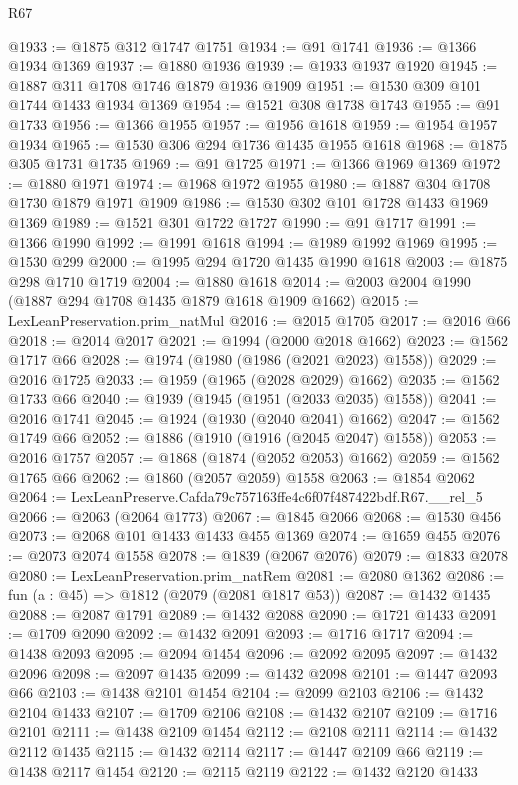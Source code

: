 \begin{lexlean}{R67}
\begin{coremodule}
@1933 := @1875 @312 @1747 @1751
@1934 := @91 @1741
@1936 := @1366 @1934 @1369
@1937 := @1880 @1936
@1939 := @1933 @1937 @1920
@1945 := @1887 @311 @1708 @1746 @1879 @1936 @1909
@1951 := @1530 @309 @101 @1744 @1433 @1934 @1369
@1954 := @1521 @308 @1738 @1743
@1955 := @91 @1733
@1956 := @1366 @1955
@1957 := @1956 @1618
@1959 := @1954 @1957 @1934
@1965 := @1530 @306 @294 @1736 @1435 @1955 @1618
@1968 := @1875 @305 @1731 @1735
@1969 := @91 @1725
@1971 := @1366 @1969 @1369
@1972 := @1880 @1971
@1974 := @1968 @1972 @1955
@1980 := @1887 @304 @1708 @1730 @1879 @1971 @1909
@1986 := @1530 @302 @101 @1728 @1433 @1969 @1369
@1989 := @1521 @301 @1722 @1727
@1990 := @91 @1717
@1991 := @1366 @1990
@1992 := @1991 @1618
@1994 := @1989 @1992 @1969
@1995 := @1530 @299
@2000 := @1995 @294 @1720 @1435 @1990 @1618
@2003 := @1875 @298 @1710 @1719
@2004 := @1880 @1618
@2014 := @2003 @2004 @1990 (@1887 @294 @1708 @1435 @1879 @1618 @1909 @1662)
@2015 := LexLeanPreservation.prim_natMul
@2016 := @2015 @1705
@2017 := @2016 @66
@2018 := @2014 @2017
@2021 := @1994 (@2000 @2018 @1662)
@2023 := @1562 @1717 @66
@2028 := @1974 (@1980 (@1986 (@2021 @2023) @1558))
@2029 := @2016 @1725
@2033 := @1959 (@1965 (@2028 @2029) @1662)
@2035 := @1562 @1733 @66
@2040 := @1939 (@1945 (@1951 (@2033 @2035) @1558))
@2041 := @2016 @1741
@2045 := @1924 (@1930 (@2040 @2041) @1662)
@2047 := @1562 @1749 @66
@2052 := @1886 (@1910 (@1916 (@2045 @2047) @1558))
@2053 := @2016 @1757
@2057 := @1868 (@1874 (@2052 @2053) @1662)
@2059 := @1562 @1765 @66
@2062 := @1860 (@2057 @2059) @1558
@2063 := @1854 @2062
@2064 := LexLeanPreserve.Cafda79c757163ffe4c6f07f487422bdf.R67.__rel_5
@2066 := @2063 (@2064 @1773)
@2067 := @1845 @2066
@2068 := @1530 @456
@2073 := @2068 @101 @1433 @1433 @455 @1369
@2074 := @1659 @455
@2076 := @2073 @2074 @1558
@2078 := @1839 (@2067 @2076)
@2079 := @1833 @2078
@2080 := LexLeanPreservation.prim_natRem
@2081 := @2080 @1362
@2086 := fun (a : @45) => @1812 (@2079 (@2081 @1817 @53))
@2087 := @1432 @1435
@2088 := @2087 @1791
@2089 := @1432 @2088
@2090 := @1721 @1433
@2091 := @1709 @2090
@2092 := @1432 @2091
@2093 := @1716 @1717
@2094 := @1438 @2093
@2095 := @2094 @1454
@2096 := @2092 @2095
@2097 := @1432 @2096
@2098 := @2097 @1435
@2099 := @1432 @2098
@2101 := @1447 @2093 @66
@2103 := @1438 @2101 @1454
@2104 := @2099 @2103
@2106 := @1432 @2104 @1433
@2107 := @1709 @2106
@2108 := @1432 @2107
@2109 := @1716 @2101
@2111 := @1438 @2109 @1454
@2112 := @2108 @2111
@2114 := @1432 @2112 @1435
@2115 := @1432 @2114
@2117 := @1447 @2109 @66
@2119 := @1438 @2117 @1454
@2120 := @2115 @2119
@2122 := @1432 @2120 @1433

\end{coremodule}
\end{lexlean}
